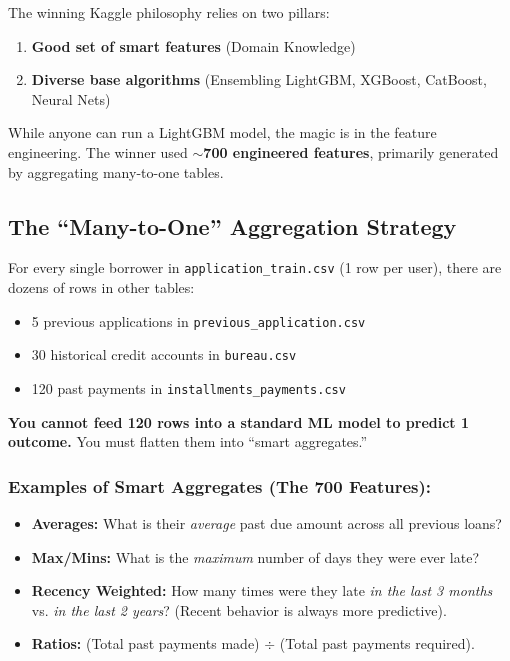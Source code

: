 \documentclass[11pt,a4paper]{article}
\begin{document}
The winning Kaggle philosophy relies on two pillars:
\begin{enumerate}
    \item \textbf{Good set of smart features} (Domain Knowledge)
    \item \textbf{Diverse base algorithms} (Ensembling LightGBM, XGBoost, CatBoost, Neural Nets)
\end{enumerate}

While anyone can run a LightGBM model, the magic is in the feature engineering. The winner used \textbf{$\sim$700 engineered features}, primarily generated by aggregating many-to-one tables.

\subsection{The ``Many-to-One'' Aggregation Strategy}
For every single borrower in \texttt{application\_train.csv} (1 row per user), there are dozens of rows in other tables:
\begin{itemize}
    \item 5 previous applications in \texttt{previous\_application.csv}
    \item 30 historical credit accounts in \texttt{bureau.csv}
    \item 120 past payments in \texttt{installments\_payments.csv}
\end{itemize}

\textbf{You cannot feed 120 rows into a standard ML model to predict 1 outcome.} You must flatten them into ``smart aggregates.''

\subsubsection{Examples of Smart Aggregates (The 700 Features):}
\begin{itemize}
    \item \textbf{Averages:} What is their \textit{average} past due amount across all previous loans?
    \item \textbf{Max/Mins:} What is the \textit{maximum} number of days they were ever late?
    \item \textbf{Recency Weighted:} How many times were they late \textit{in the last 3 months} vs. \textit{in the last 2 years}? (Recent behavior is always more predictive).
    \item \textbf{Ratios:} (Total past payments made) $\div$ (Total past payments required).
\end{itemize}
\end{document}
